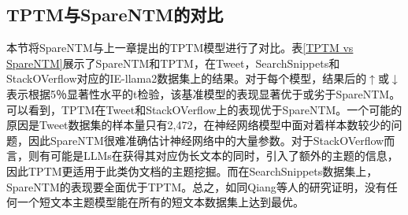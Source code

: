 \begin{table}
    \centering
    \caption{20News、Wiki 和 SearchSnippets分别在SpareNTM和SpareNTM-MF（使用均值场推断）下的结果}
    \label{ablation2}
\end{table}

\subsection{TPTM与SpareNTM的对比}
本节将SpareNTM与上一章提出的TPTM模型进行了对比。表\ref{TPTM vs SpareNTM}展示了SpareNTM和TPTM，在Tweet，SearchSnippets和StackOVerflow对应的IE-llama2数据集上的结果。对于每个模型，结果后的$\uparrow$或$\downarrow$表示根据5％显著性水平的t检验，该基准模型的表现显著优于或劣于SpareNTM。可以看到，TPTM在Tweet和StackOVerflow上的表现优于SpareNTM。一个可能的原因是Tweet数据集的样本量只有2,472，在神经网络模型中面对着样本数较少的问题，因此SpareNTM很难准确估计神经网络中的大量参数。对于StackOVerflow而言，则有可能是LLMs在获得其对应伪长文本的同时，引入了额外的主题的信息，因此TPTM更适用于此类伪文档的主题挖掘。而在SearchSnippets数据集上，SpareNTM的表现要全面优于TPTM。总之，如同Qiang\cite{STTM}等人的研究证明，没有任何一个短文本主题模型能在所有的短文本数据集上达到最优。

